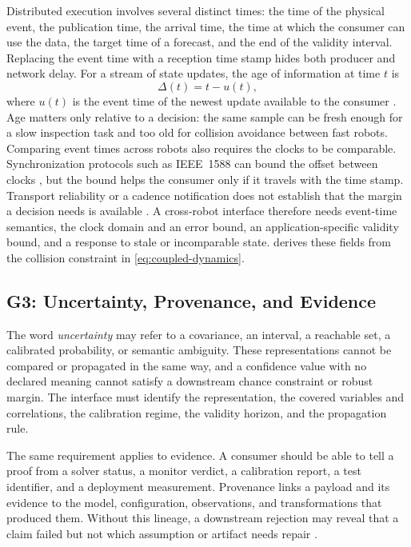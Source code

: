 Distributed execution involves several distinct times: the time of the physical
event, the publication time, the arrival time, the time at which the consumer
can use the data, the target time of a forecast, and the end of the validity
interval.  Replacing the event time with a reception time stamp hides both
producer and network delay.  For a stream of state updates, the age of
information at time $t$ is
\begin{equation}
  \Delta(t)=t-u(t),
  \label{eq:aoi}
\end{equation}
where $u(t)$ is the event time of the newest update available to the consumer
\cite{kaul2012aoi}.  Age matters only relative to a decision: the same sample can
be fresh enough for a slow inspection task and too old for collision avoidance
between fast robots.  Comparing event times across robots also requires the
clocks to be comparable.  Synchronization protocols such as IEEE~1588 can bound
the offset between clocks \cite{ieee2020ptp}, but the bound helps the consumer
only if it travels with the time stamp.  Transport reliability or a cadence
notification does not establish that the margin a decision needs is available
\cite{omg2015dds,kronauer2021latency}.  A cross-robot interface therefore needs
event-time semantics, the clock domain and an error bound, an
application-specific validity bound, and a response to stale or incomparable
state.   derives these fields from the collision
constraint in \eqref{eq:coupled-dynamics}.

\subsection{G3: Uncertainty, Provenance, and Evidence}

The word \emph{uncertainty} may refer to a covariance, an interval, a reachable
set, a calibrated probability, or semantic ambiguity.  These representations
cannot be compared or propagated in the same way, and a confidence value with no
declared meaning cannot satisfy a downstream chance constraint or robust margin.
The interface must identify the representation, the covered variables and
correlations, the calibration regime, the validity horizon, and the propagation
rule.

The same requirement applies to evidence.  A consumer should be able to tell a
proof from a solver status, a monitor verdict, a calibration report, a test
identifier, and a deployment measurement.  Provenance links a payload and its
evidence to the model, configuration, observations, and transformations that
produced them.  Without this lineage, a downstream rejection may reveal that a
claim failed but not which assumption or artifact needs repair
\cite{kim2026safeembodied,w3c2013prov}.

